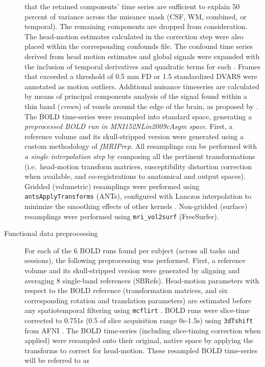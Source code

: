 \documentclass[
]{article}
\begin{document}
\begin{description}
that the retained components' time series are sufficient to explain 50
percent of variance across the nuisance mask (CSF, WM, combined, or
temporal). The remaining components are dropped from consideration. The
head-motion estimates calculated in the correction step were also placed
within the corresponding confounds file. The confound time series
derived from head motion estimates and global signals were expanded with
the inclusion of temporal derivatives and quadratic terms for each
\citep{confounds_satterthwaite_2013}. Frames that exceeded a threshold
of 0.5 mm FD or 1.5 standardized DVARS were annotated as motion
outliers. Additional nuisance timeseries are calculated by means of
principal components analysis of the signal found within a thin band
(\emph{crown}) of voxels around the edge of the brain, as proposed by
\citep{patriat_improved_2017}. The BOLD time-series were resampled into
standard space, generating a \emph{preprocessed BOLD run in
MNI152NLin2009cAsym space}. First, a reference volume and its
skull-stripped version were generated using a custom methodology of
\emph{fMRIPrep}. All resamplings can be performed with \emph{a single
interpolation step} by composing all the pertinent transformations
(i.e.~head-motion transform matrices, susceptibility distortion
correction when available, and co-registrations to anatomical and output
spaces). Gridded (volumetric) resamplings were performed using
\texttt{antsApplyTransforms} (ANTs), configured with Lanczos
interpolation to minimize the smoothing effects of other kernels
\citep{lanczos}. Non-gridded (surface) resamplings were performed using
\texttt{mri\_vol2surf} (FreeSurfer).
\item[Functional data preprocessing]
For each of the 6 BOLD runs found per subject (across all tasks and
sessions), the following preprocessing was performed. First, a reference
volume and its skull-stripped version were generated by aligning and
averaging 8 single-band references (SBRefs). Head-motion parameters with
respect to the BOLD reference (transformation matrices, and six
corresponding rotation and translation parameters) are estimated before
any spatiotemporal filtering using \texttt{mcflirt} \citep[FSL
6.0.5.1:57b01774,][]{mcflirt}. BOLD runs were slice-time corrected to
0.751s (0.5 of slice acquisition range 0s-1.5s) using \texttt{3dTshift}
from AFNI \citep[RRID:SCR\_005927]{afni}. The BOLD time-series
(including slice-timing correction when applied) were resampled onto
their original, native space by applying the transforms to correct for
head-motion. These resampled BOLD time-series will be referred to as

\end{description}
\end{document}
